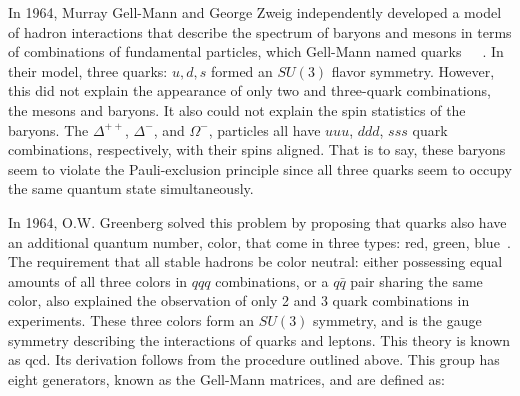 \par In 1964, Murray Gell-Mann and George Zweig independently developed a model
of hadron interactions that describe the spectrum of baryons and
mesons in terms of combinations of fundamental particles, which
Gell-Mann named
quarks~\cite{th:GellMann_QuarkModel}~\cite{th:Zweig_QuarkModel1}~\cite{th:Zweig_QuarkModel2}.
In their model, three quarks: $u, d, s$ formed an $SU(3)$ flavor
symmetry.  However, this did not explain the appearance of only two
and three-quark combinations, the mesons and baryons.  It also could
not explain the spin statistics of the baryons.  The $\Delta^{++}$,
$\Delta^{-}$, and $\Omega^{-}$, particles all have $uuu$, $ddd$, $sss$
quark combinations, respectively, with their spins aligned.  That is
to say, these baryons seem to violate the Pauli-exclusion principle
since all three quarks seem to occupy the same quantum state
simultaneously.   

\par  In 1964, O.W. Greenberg solved this problem by proposing that quarks also have
an additional quantum number, color, that come in three types: red,
green, blue~\cite{th:Greenberg_color}.  The requirement that all
stable hadrons be color neutral: either possessing equal amounts of
all three colors in $qqq$ combinations, or a $q\bar{q}$ pair sharing the
same color, also explained the observation of only 2 and 3 quark
combinations in experiments.  These three colors form an
$SU(3)$ symmetry, and is the gauge symmetry describing the
interactions of quarks and leptons.  This theory is known as
\acrfull{qcd}.  Its derivation follows from the procedure outlined
above.  This group has eight generators, known as the Gell-Mann
matrices, and are defined as: 

